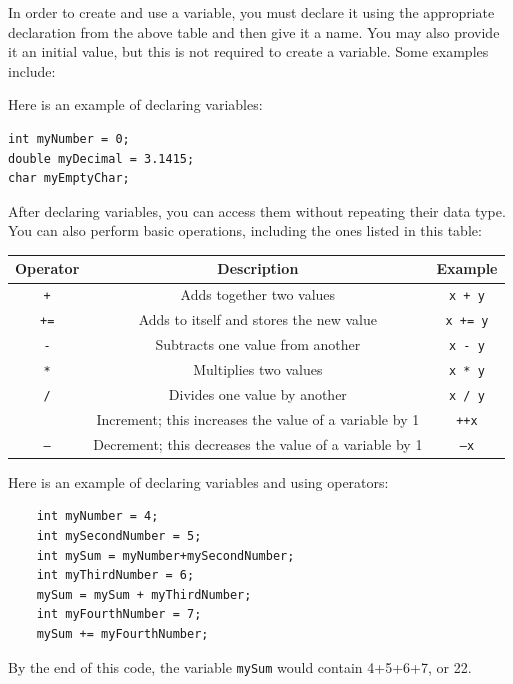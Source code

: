 In order to create and use a variable, you must declare it using the appropriate declaration from the above table and then give it a name. You may also provide it an initial value, but this is not required to create a variable. Some examples include:

\begin{example}
Here is an example of declaring variables:
\begin{verbatim}
int myNumber = 0;
double myDecimal = 3.1415;
char myEmptyChar;
\end{verbatim}
\end{example}

After declaring variables, you can access them without repeating their data type. You can also perform basic operations, including the ones listed in this table:

\begin{table}[H]
    \centering
    \begin{tabular}{c|c|c}\hline
        Operator & Description & Example \\ \hline
        \texttt{+}	& Adds together two values & \texttt{x + y}\\
        \texttt{+=} & Adds to itself and stores the new value& \texttt{x += y}\\
        \texttt{-} & Subtracts one value from another & \texttt{x - y} \\
        \texttt{*} &	Multiplies two values & \texttt{x * y} \\
        \texttt{/} & Divides one value by another & \texttt{x / y} \\
        \texttt{%
        \texttt{++} & Increment; this increases the value of a variable by 1 & \texttt{++x} \\
        \texttt{--} & Decrement; this decreases the value of a variable by 1 & \texttt{--x}
    \end{tabular}
\end{table}

\begin{example}
Here is an example of declaring variables and using operators:
\begin{verbatim}
    int myNumber = 4;
    int mySecondNumber = 5;
    int mySum = myNumber+mySecondNumber;
    int myThirdNumber = 6;
    mySum = mySum + myThirdNumber;
    int myFourthNumber = 7;
    mySum += myFourthNumber;
\end{verbatim}

By the end of this code, the variable \texttt{mySum} would contain 4+5+6+7, or 22. 
\end{example}

